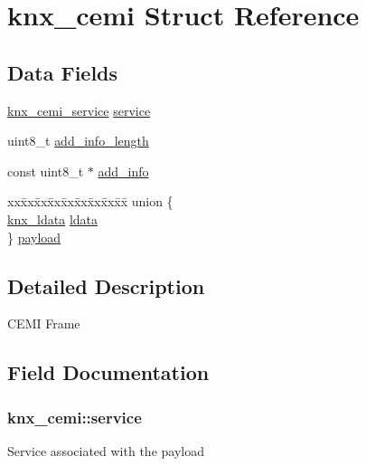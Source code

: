 \hypertarget{structknx__cemi}{}\section{knx\+\_\+cemi Struct Reference}
\label{structknx__cemi}
\subsection*{Data Fields}
\begin{DoxyCompactItemize}
\item 
\hyperlink{cemi_8h_ae47bed4554412a1c2fa3778705375754}{knx\+\_\+cemi\+\_\+service} \hyperlink{structknx__cemi_a848025719353fe6117f7ec1635a85121}{service}
\item 
uint8\+\_\+t \hyperlink{structknx__cemi_a05fd38c4fb0b7bd6a8d61c802f1618b7}{add\+\_\+info\+\_\+length}
\item 
const uint8\+\_\+t $\ast$ \hyperlink{structknx__cemi_a3b204edb6ecc8a54ee031eb63c39d277}{add\+\_\+info}
\item 
\begin{tabbing}
xx\=xx\=xx\=xx\=xx\=xx\=xx\=xx\=xx\=\kill
union \{\\
\>\hyperlink{structknx__ldata}{knx\_ldata} \hyperlink{structknx__cemi_a1ea2d0836b3d335119fee3c82e27e12e}{ldata}\\
\} \hyperlink{structknx__cemi_a5a5e3f227b32d442cd5c2a8e69e8134b}{payload}\\

\end{tabbing}\end{DoxyCompactItemize}


\subsection{Detailed Description}
C\+E\+MI Frame 

\subsection{Field Documentation}
\subsubsection[{\texorpdfstring{service}{service}}]{ knx\+\_\+cemi\+::service}\hypertarget{structknx__cemi_a848025719353fe6117f7ec1635a85121}{}\label{structknx__cemi_a848025719353fe6117f7ec1635a85121}
Service associated with the payload 
